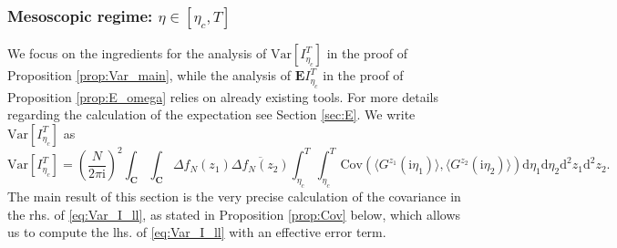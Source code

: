 \documentclass[10pt]{amsart}
\numberwithin{equation}{section}
\newcommand{\dif}{\mathrm{d}}
\newcommand{\E}{\mathbf{E}}
\newcommand{\C}{\mathbf{C}}
\newcommand{\Cov}{\mathrm{Cov}}
\newcommand{\Var}{\mathrm{Var}}
\newcommand{\ii}{\mathrm{i}}
\begin{document}
\subsubsection{Mesoscopic regime: $\eta\in [\eta_c,T]$}\label{sec:large_eta} We focus on the ingredients for the analysis of $\Var[I_{\eta_c}^T]$ in the proof of Proposition \ref{prop:Var_main}, while the analysis of $\E I_{\eta_c}^T$ in the proof of Proposition \ref{prop:E_omega} relies on already existing tools. For more details regarding the calculation of the expectation see Section \ref{sec:E}. We write $\Var[I_{\eta_c}^T]$ as
\begin{equation}
\Var[I_{\eta_c}^T]= \left(\frac{N}{2\pi\ii}\right)^2 \int_\C\int_\C \Delta f_N(z_1)\overline{\Delta f_N(z_2)} \int_{\eta_c}^T\int_{\eta_c}^T \Cov\left(\langle G^{z_1}(\ii\eta_1)\rangle, \langle G^{z_2}(\ii\eta_2)\rangle\right)\dif\eta_1\dif\eta_2\dif^2 z_1\dif^2 z_2.
\label{eq:Var_I_ll} 
\end{equation}
The main result of this section is the very precise calculation of the covariance in the rhs. of \eqref{eq:Var_I_ll}, as stated in Proposition \ref{prop:Cov} below, which allows us to compute the lhs. of \eqref{eq:Var_I_ll} with an effective error term. 
\end{document}
